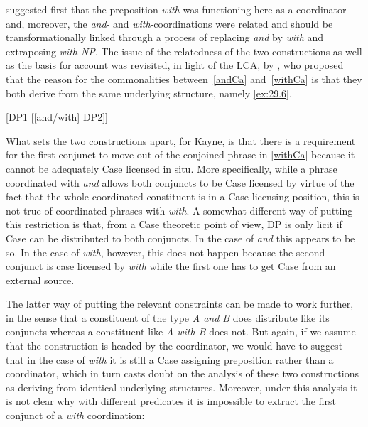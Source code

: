 \documentclass[output=paper]{langsci/langscibook}
\begin{document}
\ea\label{ex:29.5}
    \z
\z

\cite{lakoff-peters:69} suggested first that the preposition \emph{with} was
functioning here as a coordinator and, moreover, the \emph{and}- and
\emph{with}-coordinations were related and should be transformationally linked
through a process of replacing \emph{and} by \emph{with} and extraposing
\emph{with NP}.  The issue of the relatedness of the two constructions as well
as the basis for  account was revisited, in light of
the \gls{LCA}, by
\cite[§6.3]{Kayne1994}, who proposed that the reason for the commonalities
between~\eqref{andCa} and~\eqref{withCa} is that they both derive from the same
underlying structure, namely \eqref{ex:29.6}.

\ea\label{ex:29.6}
    {}[DP1 [[and/with] DP2]]
\z

What sets the two constructions apart, for Kayne, is that there is a
requirement for the first conjunct to move out of the conjoined phrase in
\eqref{withCa} because it cannot be adequately Case licensed in situ. More
specifically, while a phrase coordinated with \emph{and} allows both
conjuncts to be Case licensed by virtue of the fact that the whole coordinated
constituent is in a Case-licensing position, this is not true of coordinated
phrases with \emph{with}. A somewhat different way of putting this
restriction is that, from a Case theoretic point of view, DP  is
only licit if Case can be distributed to both conjuncts. In the case of
\emph{and} this appears to be so. In the case of \emph{with}, however,
this does not happen because the second conjunct is case licensed by
\emph{with} while the first one has to get Case from an external source.

The latter way of putting the relevant constraints can be made to work further,
in the sense that a constituent of the type \emph{A and B} does distribute like
its conjuncts whereas a constituent like \emph{A with B} does not. But again,
if we assume that the construction is headed by the coordinator, we would have
to suggest that in the case of \emph{with} it is still a Case assigning
preposition rather than a coordinator, which in turn casts doubt on the
analysis of these two constructions as deriving from identical underlying
structures. Moreover, under this analysis it is not clear why with different
predicates it is impossible to extract the first conjunct of a \emph{with}
coordination:
\end{document}
